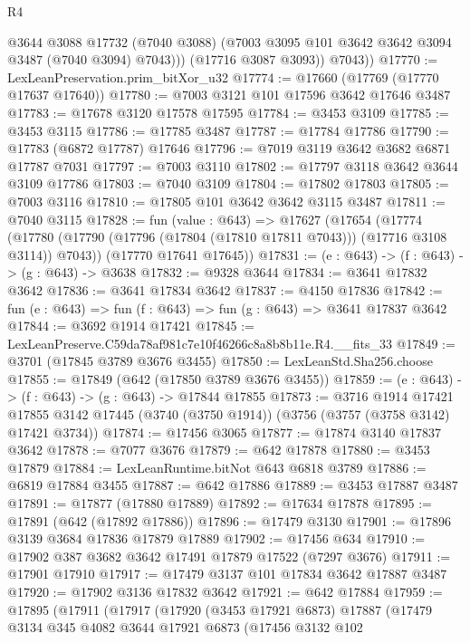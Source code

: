 \begin{lexlean}{R4}
\begin{coremodule}
              @3644
              @3088
              @17732
              (@7040 @3088)
              (@7003 @3095 @101 @3642 @3642 @3094 @3487 (@7040 @3094) @7043)))
          (@17716 @3087 @3093))
        @7043))
@17770 := LexLeanPreservation.prim_bitXor_u32
@17774 := @17660 (@17769 (@17770 @17637 @17640))
@17780 := @7003 @3121 @101 @17596 @3642 @17646 @3487
@17783 := @17678 @3120 @17578 @17595
@17784 := @3453 @3109
@17785 := @3453 @3115
@17786 := @17785 @3487
@17787 := @17784 @17786
@17790 := @17783 (@6872 @17787) @17646
@17796 := @7019 @3119 @3642 @3682 @6871 @17787 @7031
@17797 := @7003 @3110
@17802 := @17797 @3118 @3642 @3644 @3109 @17786
@17803 := @7040 @3109
@17804 := @17802 @17803
@17805 := @7003 @3116
@17810 := @17805 @101 @3642 @3642 @3115 @3487
@17811 := @7040 @3115
@17828 := fun (value : @643) =>
  @17627
    (@17654
      (@17774 (@17780 (@17790 (@17796 (@17804 (@17810 @17811 @7043))) (@17716 @3108 @3114)) @7043))
      (@17770 @17641 @17645))
@17831 := (e : @643) -> (f : @643) -> (g : @643) -> @3638
@17832 := @9328 @3644
@17834 := @3641 @17832 @3642
@17836 := @3641 @17834 @3642
@17837 := @4150 @17836
@17842 := fun (e : @643) => fun (f : @643) => fun (g : @643) => @3641 @17837 @3642
@17844 := @3692 @1914 @17421
@17845 := LexLeanPreserve.C59da78af981c7e10f46266c8a8b8b11e.R4.__fits_33
@17849 := @3701 (@17845 @3789 @3676 @3455)
@17850 := LexLeanStd.Sha256.choose
@17855 := @17849 (@642 (@17850 @3789 @3676 @3455))
@17859 := (e : @643) -> (f : @643) -> (g : @643) -> @17844 @17855
@17873 := @3716
    @1914
    @17421
    @17855
    @3142
    @17445
    (@3740 (@3750 @1914))
    (@3756 (@3757 (@3758 @3142) @17421 @3734))
@17874 := @17456 @3065
@17877 := @17874 @3140 @17837 @3642
@17878 := @7077 @3676
@17879 := @642 @17878
@17880 := @3453 @17879
@17884 := LexLeanRuntime.bitNot @643 @6818 @3789
@17886 := @6819 @17884 @3455
@17887 := @642 @17886
@17889 := @3453 @17887 @3487
@17891 := @17877 (@17880 @17889)
@17892 := @17634 @17878
@17895 := @17891 (@642 (@17892 @17886))
@17896 := @17479 @3130
@17901 := @17896 @3139 @3684 @17836 @17879 @17889
@17902 := @17456 @634
@17910 := @17902 @387 @3682 @3642 @17491 @17879 @17522 (@7297 @3676)
@17911 := @17901 @17910
@17917 := @17479 @3137 @101 @17834 @3642 @17887 @3487
@17920 := @17902 @3136 @17832 @3642
@17921 := @642 @17884
@17959 := @17895
    (@17911
      (@17917
        (@17920
          (@3453 @17921 @6873)
          @17887
          (@17479
            @3134
            @345
            @4082
            @3644
            @17921
            @6873
            (@17456
              @3132
              @102

\end{coremodule}
\end{lexlean}
